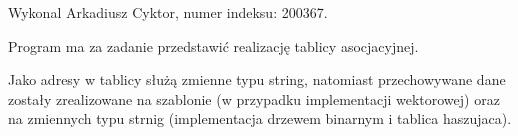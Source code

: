 \-Wykonal \-Arkadiusz \-Cyktor, numer indeksu\-: 200367.

\-Program ma za zadanie przedstawić realizację tablicy asocjacyjnej.

\-Jako adresy w tablicy służą zmienne typu string, natomiast przechowywane dane zostały zrealizowane na szablonie (w przypadku implementacji wektorowej) oraz na zmiennych typu strnig (implementacja drzewem binarnym i tablica haszujaca). 
